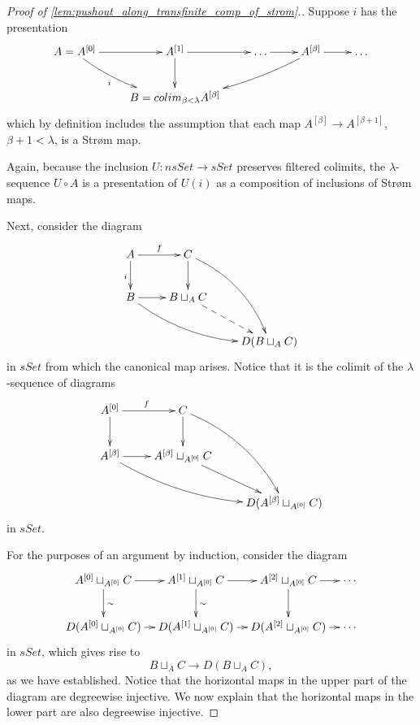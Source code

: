 \begin{proof}[Proof of \cref{lem:pushout_along_transfinite_comp_of_strom}.]
Suppose $i$ has the presentation
\begin{displaymath}
\xymatrix{
A=A^{[0]} \ar@/_/[dr]_(.4)i \ar[r] & A^{[1]} \ar[d] \ar[r] & \dots \ar[r] & A^{[\beta ]}\ar@/^/[lld] \ar[r] & \dots \\
& B=colim_{\beta <\lambda }A^{[\beta ]}
}
\end{displaymath}
which by definition includes the assumption that each map $A^{[\beta ]}\to A^{[\beta +1]}$, $\beta +1<\lambda$, is a Str\o m map. 

Again, because the inclusion $U:nsSet\to sSet$ preserves filtered colimits, the $\lambda$-sequence $U\circ A$ is a presentation of $U(i)$ as a composition of inclusions of Str\o m maps.

Next, consider the diagram
\begin{displaymath}
\xymatrix{
A \ar[d]_i \ar[r]^f & C \ar[d] \ar@/^1pc/[ddr] \\
B \ar[r] \ar@/_1pc/[drr] & B\sqcup _AC \ar@{-->}[dr] \\
&& D(B\sqcup _AC)
}
\end{displaymath}
in $sSet$ from which the canonical map arises. Notice that it is the colimit of the $\lambda$-sequence of diagrams
\begin{displaymath}
\xymatrix{
A^{[0]} \ar[d] \ar[r]^f & C \ar[d] \ar@/^1pc/[ddr] \\
A^{[\beta ]}\ar[r] \ar@/_1pc/[drr] & A^{[\beta ]}\sqcup _{A^{[0]}}C \ar[dr] \\
&& D(A^{[\beta ]}\sqcup _{A^{[0]}}C)
}
\end{displaymath}
in $sSet$.

For the purposes of an argument by induction, consider the diagram
\begin{equation}
\label{eq:diagram_proof_of_lem_pushout_along_transfinite_comp_of_strom}
\begin{gathered}
\xymatrix@C=0.9em{
A^{[0]}\sqcup _{A^{[0]}}C \ar[d]^\sim \ar[r] & A^{[1]}\sqcup _{A^{[0]}}C \ar[d]^\sim \ar[r] & A^{[2]}\sqcup _{A^{[0]}}C \ar[d] \ar[r] & \cdots \\
D(A^{[0]}\sqcup _{A^{[0]}}C) \ar[r] & D(A^{[1]}\sqcup _{A^{[0]}}C) \ar[r] & D(A^{[2]}\sqcup _{A^{[0]}}C) \ar[r] & \cdots
}
\end{gathered}
\end{equation}
in $sSet$, which gives rise to
\[B\sqcup _AC\to D(B\sqcup _AC),\]
as we have established. Notice that the horizontal maps in the upper part of the diagram are degreewise injective. We now explain that the horizontal maps in the lower part are also degreewise injective.


\end{proof}
